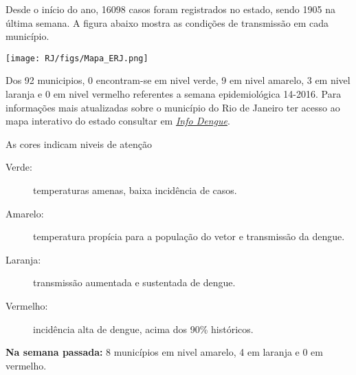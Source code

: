 \documentclass[10pt]{article} %
\begin{document}
\begin{minipage}[t]{.66\linewidth} %

\hypertarget{titulo}{} %

Desde o início do ano, 16098 casos foram registrados no estado, sendo 1905 na última semana. A figura abaixo mostra as condições de transmissão em cada município.

\texttt{[image: RJ/figs/Mapa\_ERJ.png]}

Dos 92 municipios, 0 encontram-se em nivel verde, 9 em nivel amarelo, 3 em nivel laranja e 0 em nivel vermelho referentes a semana epidemiológica 14-2016. Para informações mais atualizadas
sobre o município do Rio de Janeiro ter acesso ao mapa interativo do estado consultar em \href{http://info.dengue.mat.br}{\textit{Info Dengue}}.


\vspace{1cm}
\begin{mdframed}[style=intextbox,frametitle={}] %

\hypertarget{descriptivebox}{} %
As cores indicam niveis de atenção
\begin{description}
\item[Verde:] temperaturas amenas, baixa incidência de casos.      
\item[Amarelo:] temperatura propícia para a população do vetor e transmissão da dengue.
\item[Laranja:] transmissão aumentada e sustentada de dengue. 
\item[Vermelho:] incidência alta de dengue, acima dos 90\% históricos.
\end{description}
\end{mdframed}

 \textbf{Na semana passada:} 8 municípios em nivel amarelo, 4 em laranja e 0 em vermelho.    

\end{minipage} %
\end{document}

